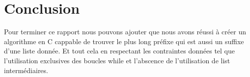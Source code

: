 \section{Conclusion}\label{conclusion}


Pour terminer ce rapport nous pouvons ajouter que nous avons réussi à créer un algorithme
en C cappable de trouver le plus long préfixe qui est aussi un suffixe d'une liste donnée.
Et tout cela en respectant les contraintes données tel que l'utilisation exclusives des
boucles while et l'abscence de l'utilisation de list intermédiaires.
